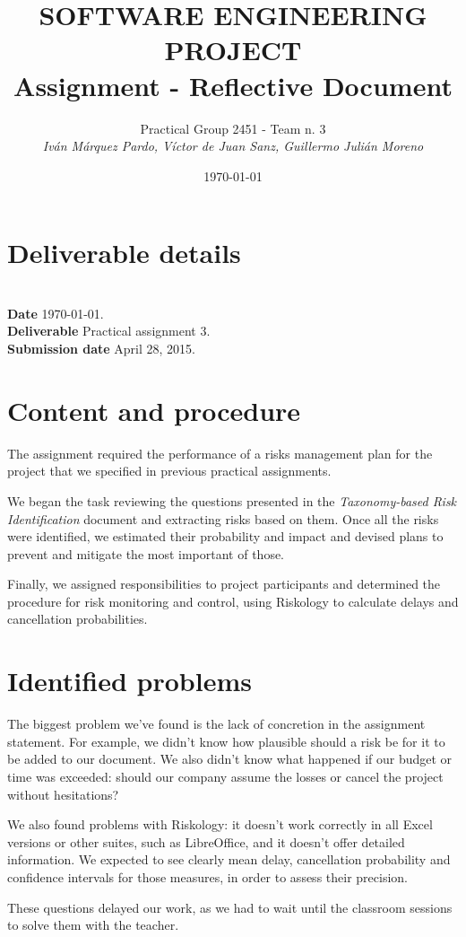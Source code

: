 \documentclass{article}
\title{SOFTWARE ENGINEERING PROJECT\\Assignment  - Reflective Document}
\date{\today}
\author{Practical Group 2451 - Team n. 3 \\ \vspace{5pt} \textit{Iván Márquez Pardo, Víctor de Juan Sanz, Guillermo Julián Moreno}}
\newcommand{\header}[1]{\\ \indent \textbf{#1}\hspace{10pt}}
\begin{document}
\maketitle
\pagestyle{plain}

\section{Deliverable details}

\noindent
\header{Date} \today.
\header{Deliverable} Practical assignment 3.
\header{Submission date} April 28, 2015.

\section{Content and procedure}

The assignment required the performance of a risks management plan for the project that we specified in previous practical assignments.

We began the task reviewing the questions presented in the \textit{Taxonomy-based Risk Identification} document and extracting risks based on them. Once all the risks were identified, we estimated their probability and impact and devised plans to prevent and mitigate the most important of those.

Finally, we assigned responsibilities to project participants and determined the procedure for risk monitoring and control, using Riskology to calculate delays and cancellation probabilities.

\section{Identified problems}

The biggest problem we've found is the lack of concretion in the assignment statement. For example, we didn't know how plausible should a risk be for it to be added to our document. We also didn't know what happened if our budget or time was exceeded: should our company assume the losses or cancel the project without hesitations?

We also found problems with Riskology: it doesn't work correctly in all Excel versions or other suites, such as LibreOffice, and it doesn't offer detailed information. We expected to see clearly mean delay, cancellation probability and confidence intervals for those measures, in order to assess their precision.

These questions delayed our work, as we had to wait until the classroom sessions to solve them with the teacher.
\end{document}
